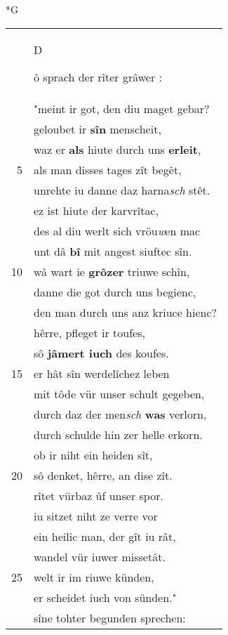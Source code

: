 \documentclass[8pt,a4paper,notitlepage]{article}
\begin{document}
\newpage
\begin{table}[ht]
\begin{minipage}[t]{0.5\linewidth}
\small
\begin{center}*G
\end{center}
\begin{tabular}{rl}
 & \begin{large}D\end{large}ô sprach der rîter grâwer :\\ 
 & "meint ir got, den diu maget gebar?\\ 
 & geloubet ir \textbf{sîn} menscheit,\\ 
 & waz er \textbf{als} hiute durch uns \textbf{erleit},\\ 
5 & als man disses tages zît begêt,\\ 
 & unrehte iu danne daz harna\textit{sch} stêt.\\ 
 & ez ist hiute der karvrîtac,\\ 
 & des al diu werlt sich vröu\textit{w}en mac\\ 
 & unt dâ \textbf{bî} mit angest siuftec sîn.\\ 
10 & wâ wart ie \textbf{grôzer} triuwe schîn,\\ 
 & danne die got durch uns begienc,\\ 
 & den man durch uns anz kriuce hienc?\\ 
 & hêrre, pfleget ir toufes,\\ 
 & sô \textbf{jâmert iuch} des koufes.\\ 
15 & er hât sîn werdelîchez leben\\ 
 & mit tôde vür unser schult gegeben,\\ 
 & durch daz der men\textit{sch} \textbf{was} verlorn,\\ 
 & durch schulde hin zer helle erkorn.\\ 
 & ob ir niht ein heiden sît,\\ 
20 & sô denket, hêrre, an dise zît.\\ 
 & rîtet vürbaz ûf unser spor.\\ 
 & iu sitzet niht ze verre vor\\ 
 & ein heilic man, der gît iu rât,\\ 
 & wandel vür iuwer missetât.\\ 
25 & welt ir im riuwe künden,\\ 
 & er scheidet iuch von sünden."\\ 
 & sîne tohter begunden sprechen:\\ 

\end{tabular}
\end{minipage}
\end{table}
\end{document}

